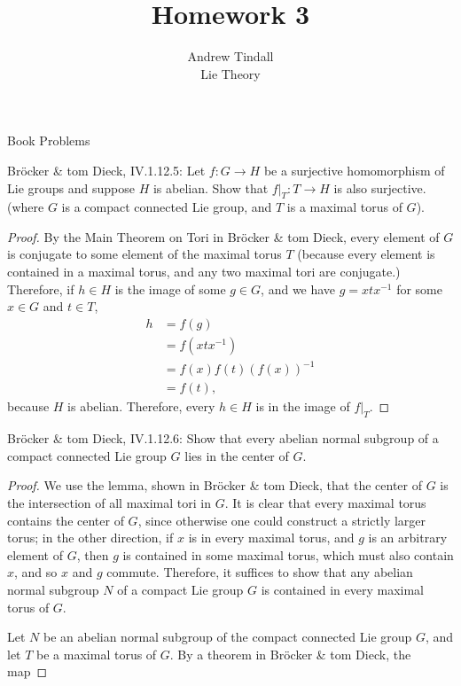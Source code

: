 \documentclass[12pt]{article}
\theoremstyle{definition}
\newenvironment{problem}[2][Problem]{\begin{trivlist}
\item[\hskip \labelsep {\bfseries #1}\hskip \labelsep {\bfseries #2.}]}{\end{trivlist}}
\begin{document}
 
 
\title{Homework 3}
\author{Andrew Tindall\\
Lie Theory}
 
\maketitle
\begin{section}{Book Problems}
	\begin{problem}{1}
		Br\"ocker \& tom Dieck, IV.1.12.5: Let $f: G \to H$ be a surjective homomorphism of Lie groups and suppose $H$ is abelian. Show that $f\lvert_T: T \to H$ is also surjective. (where $G$ is a compact connected Lie group, and $T$ is a maximal torus of $G$).
		\begin{proof}
			By the Main Theorem on Tori in Br\"ocker \& tom Dieck, every element of $G$ is conjugate to some element of the maximal torus $T$ (because every element is contained in a maximal torus, and any two maximal tori are conjugate.) Therefore, if $h \in H$ is the image of some $g \in G$, and we have $g = xtx^{-1}$ for some $x \in G$ and $ t \in T$,
			\begin{align*}
				h &= f(g)\\
				&= f(xtx^{-1})\\
				&= f(x)f(t)(f(x))^{-1}\\
				&= f(t),
			\end{align*}
			because $H$ is abelian. Therefore, every $h \in H$ is in the image of $f\lvert_T$.
		\end{proof}
	\end{problem}
	\begin{problem}{2}
		Br\"ocker \& tom Dieck, IV.1.12.6: Show that every abelian normal subgroup of a compact connected Lie group $G$ lies in the center of $G$.
		\begin{proof}
			We use the lemma, shown in Br\"ocker \& tom Dieck, that the center of $G$ is the intersection of all maximal tori in $G$. It is clear that every maximal torus contains the center of $G$, since otherwise one could construct a strictly larger torus; in the other direction, if $x$ is in every maximal torus, and $g$ is an arbitrary element of $G$, then $g$ is contained in some maximal torus, which must also contain $x$, and so $x$ and $g$ commute. Therefore, it suffices to show that any abelian normal subgroup $N$ of a compact Lie group $G$ is contained in every maximal torus of $G$. 
			\par Let $N$ be an abelian normal subgroup of the compact connected Lie group $G$, and let $T$ be a maximal torus of $G$. By a theorem in Br\"ocker \& tom Dieck, the map

\end{proof}
\end{problem}
\end{section}
\end{document}
